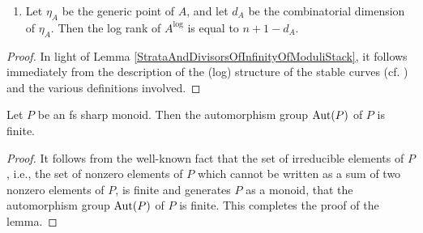 \begin{lem}
\begin{enumerate}
\begin{enumerate}
\begin{center}
        \end{center}
      \end{enumerate}
    \item Let $\eta_A$ be the generic point of $A$, and let $d_A$ be the combinatorial dimension of $\eta_A$. Then the log rank of $A^\log$ is equal to $n + 1 - d_A$.
  \end{enumerate}
\end{lem}
\begin{proof}
  In light of Lemma \ref{StrataAndDivisorsOfInfinityOfModuliStack}, it follows immediately from the description of the (log) structure of the stable curves (cf. \cite{KatoF}) and the various definitions involved.
\end{proof}

\begin{lem}\label{FinitenessOfAutomorphismGroupsOfSharpMonoids}
  Let $P$ be an fs sharp monoid. Then the automorphism group $\mathrm{Aut}(P)$ of $P$ is finite.
\end{lem}
\begin{proof}
  It follows from the well-known fact that the set of irreducible elements of $P$, i.e., the set of nonzero elements of $P$ which cannot be written as a sum of two nonzero elements of $P$, is finite and generates $P$ as a monoid, that the automorphism group $\mathrm{Aut}(P)$ of $P$ is finite. This completes the proof of the lemma.
\end{proof}

